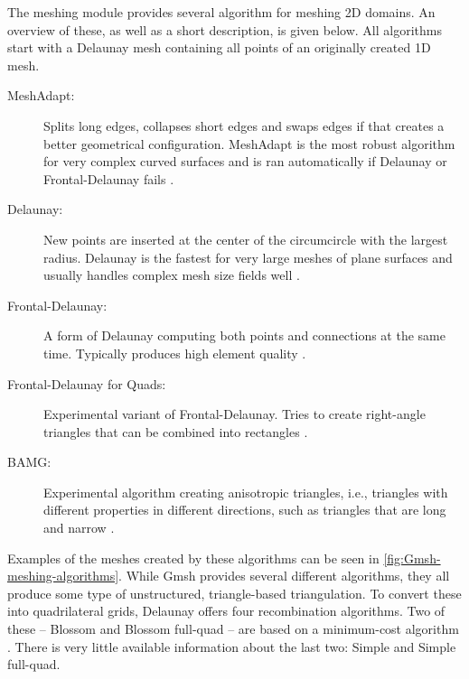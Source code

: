 The meshing module provides several algorithm for meshing 2D domains. An overview of these, as well as a short description, is given below. All algorithms start with a Delaunay mesh containing all points of an originally created 1D mesh.
\begin{description}
    \item[MeshAdapt:] Splits long edges, collapses short edges and swaps edges if that creates a better geometrical configuration. MeshAdapt is the most robust algorithm for very complex curved surfaces and is ran automatically if Delaunay or Frontal-Delaunay fails \cite{Gmsh_reference}.
    \item[Delaunay:] New points are inserted at the center of the circumcircle with the largest radius. Delaunay is the fastest for very large meshes of plane surfaces and usually handles complex mesh size fields well \cite{Gmsh_reference}.
    \item[Frontal-Delaunay:] A form of Delaunay computing both points and connections at the same time. Typically produces high element quality \cite{Gmsh_reference}.
    \item[Frontal-Delaunay for Quads:] Experimental variant of Frontal-Delaunay. Tries to create right-angle triangles that can be combined into rectangles \cite{Gmsh_reference}.
    \item[BAMG:] Experimental algorithm creating anisotropic triangles, i.e., triangles with different properties in different directions, such as triangles that are long and narrow \cite{Gmsh_reference}.
\end{description}

Examples of the meshes created by these algorithms can be seen in \autoref{fig:Gmsh-meshing-algorithms}. While Gmsh provides several different algorithms, they all produce some type of unstructured, triangle-based triangulation. To convert these into quadrilateral grids, Delaunay offers four recombination algorithms. Two of these -- Blossom and Blossom full-quad -- are based on a minimum-cost algorithm \cite{Gmsh_article}. There is very little available information about the last two: Simple and Simple full-quad.

